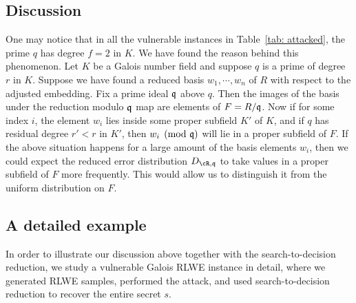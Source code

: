 \documentclass{amsart}
\begin{document}



\subsection{Discussion}
One may notice that in all the vulnerable instances in Table~\ref{tab: attacked}, the prime $q$ has degree $f = 2$ in $K$. We have found the reason behind this phenomenon. Let $K$  be a Galois number field and suppose $q$ is a prime of degree $r$ in $K$. Suppose we have found a reduced basis $w_1,\cdots, w_n$ of $R$ with respect to the adjusted embedding. Fix a prime ideal $\mathfrak{q}$ above $q$. Then the images of the basis under the reduction modulo $\mathfrak{q}$ map are elements of $F = R/\mathfrak{q}$. Now if for some index $i$, the element $w_i$ lies inside some proper subfield $K'$ of $K$, and if $q$ has residual degree $r' < r$ in $K'$, then $w_i \pmod{\mathfrak{q}}$ will lie in a proper subfield of $F$. If the above situation happens for a large amount of the basis elements $w_i$, then we could  expect the reduced error distribution $D_{\cR,\fq}$ to take values in a proper subfield of $F$ more frequently. This would allow us to distinguish it from the uniform distribution on $F$.

\subsection{A detailed example}
In order to illustrate our discussion above together with the search-to-decision reduction, we study a vulnerable Galois RLWE instance in detail, where we generated RLWE samples, performed the attack, and used search-to-decision reduction to recover the entire secret $s$.
\end{document}

